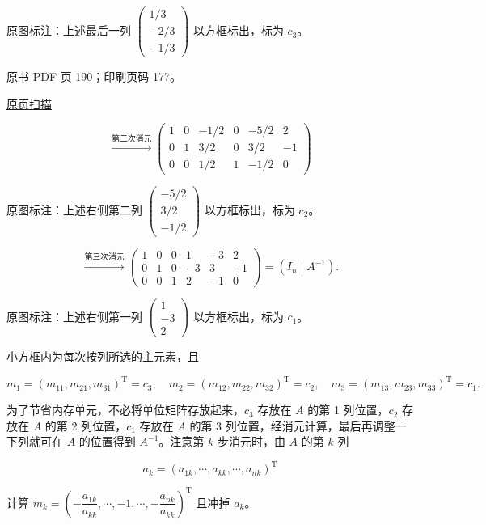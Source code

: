 原图标注：上述最后一列 \(\begin{pmatrix}1/3\\-2/3\\-1/3\end{pmatrix}\) 以方框标出，标为 \(c_3\)。

\clearpage

原书 PDF 页 190；印刷页码 177。

\href{source-images/pdf-190.jpeg}{原页扫描}

\[
\xrightarrow{\text{第二次消元}}
\left(\begin{array}{rrr|rrr}
1&0&-1/2&0&-5/2&2\\
0&1&3/2&0&3/2&-1\\
0&0&\boxed{1/2}&1&-1/2&0
\end{array}\right)
\]

原图标注：上述右侧第二列 \(\begin{pmatrix}-5/2\\3/2\\-1/2\end{pmatrix}\) 以方框标出，标为 \(c_2\)。

\[
\xrightarrow{\text{第三次消元}}
\left(\begin{array}{rrr|rrr}
1&0&0&1&-3&2\\
0&1&0&-3&3&-1\\
0&0&1&2&-1&0
\end{array}\right)=(I_n\mid A^{-1}).
\]

原图标注：上述右侧第一列 \(\begin{pmatrix}1\\-3\\2\end{pmatrix}\) 以方框标出，标为 \(c_1\)。

小方框内为每次按列所选的主元素，且

\[m_1=(m_{11},m_{21},m_{31})^{\mathrm T}=c_3,\quad
m_2=(m_{12},m_{22},m_{32})^{\mathrm T}=c_2,\quad
m_3=(m_{13},m_{23},m_{33})^{\mathrm T}=c_1.\]

为了节省内存单元，不必将单位矩阵存放起来，\(c_3\) 存放在 \(A\) 的第 1 列位置，\(c_2\) 存放在 \(A\) 的第 2 列位置，\(c_1\) 存放在 \(A\) 的第 3 列位置，经消元计算，最后再调整一下列就可在 \(A\) 的位置得到 \(A^{-1}\)。注意第 \(k\) 步消元时，由 \(A\) 的第 \(k\) 列

\[a_k=(a_{1k},\cdots,a_{kk},\cdots,a_{nk})^{\mathrm T}\]

计算 \(m_k=\left(-\dfrac{a_{1k}}{a_{kk}},\cdots,-1,\cdots,-\dfrac{a_{nk}}{a_{kk}}\right)^{\mathrm T}\) 且冲掉 \(a_k\)。

